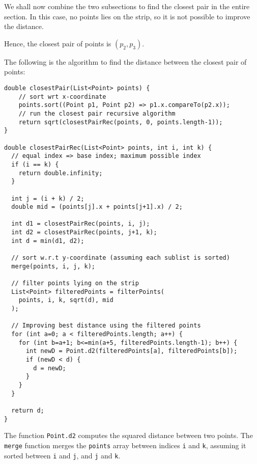 \documentclass[a4paper, openany]{memoir}
\begin{document}
\noindent We shall now combine the two subsections to find the closest pair in the entire section. In this case, no points lies on the strip, so it is not possible to improve the distance. 
\begin{figure}[H]
    \centering
\end{figure}
\noindent Hence, the closest pair of points is $(p_2, p_3)$.

The following is the algorithm to find the distance between the closest pair of points:
\begin{lstlisting}[language=pseudocode]
double closestPair(List<Point> points) {    
    // sort wrt x-coordinate
    points.sort((Point p1, Point p2) => p1.x.compareTo(p2.x));
    // run the closest pair recursive algorithm
    return sqrt(closestPairRec(points, 0, points.length-1));
}

double closestPairRec(List<Point> points, int i, int k) {
  // equal index => base index; maximum possible index
  if (i == k) {
    return double.infinity;
  }

  int j = (i + k) / 2;
  double mid = (points[j].x + points[j+1].x) / 2;

  int d1 = closestPairRec(points, i, j);
  int d2 = closestPairRec(points, j+1, k);
  int d = min(d1, d2);
  
  // sort w.r.t y-coordinate (assuming each sublist is sorted)
  merge(points, i, j, k);
  
  // filter points lying on the strip
  List<Point> filteredPoints = filterPoints(
    points, i, k, sqrt(d), mid
  );
  
  // Improving best distance using the filtered points
  for (int a=0; a < filteredPoints.length; a++) {
    for (int b=a+1; b<=min(a+5, filteredPoints.length-1); b++) {
      int newD = Point.d2(filteredPoints[a], filteredPoints[b]);
      if (newD < d) {
        d = newD;
      }
    }
  }

  return d;
}
\end{lstlisting}
\noindent The function \texttt{Point.d2} computes the squared distance between two points. The \texttt{merge} function merges the \texttt{points} array between indices \texttt{i} and \texttt{k}, assuming it sorted between \texttt{i} and \texttt{j}, and \texttt{j} and \texttt{k}.
\end{document}
